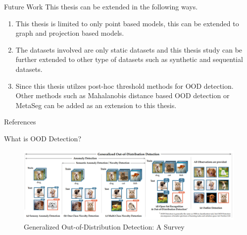 \documentclass[aspectratio=169]{beamer}
\begin{document}
\begin{frame}{Future Work}
    This thesis can be extended in the following ways.
    \begin{enumerate}
        \item This thesis is limited to only point based models, this can be extended to graph and projection based models.
        \item The datasets involved are only static datasets and this thesis study can be further extended to other type of datasets such as synthetic and sequential datasets.
        \item Since this thesis utilzes post-hoc threshold methods for OOD detection. Other methods such as Mahalanobis distance based OOD detection \cite{lee2018simple_mahalanobis} or MetaSeg \cite{MetaSeg} can be added as an extension to this thesis.
    \end{enumerate}
\end{frame}

\begin{frame}{References}
    
    

\end{frame}

\begin{frame}[noframenumbering]{What is OOD Detection?}
    \begin{figure}
        \centering
        \includegraphics[scale=0.3]{images/OOD_ex_new.jpg}
        \caption{Generalized Out-of-Distribution Detection: A Survey}
        \label{fig:my_label}
    \end{figure}
\end{frame}
\end{document}
